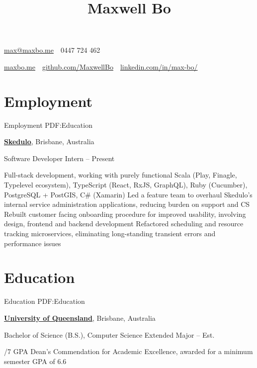 \documentclass[a4paper,10pt,oneside]{article}
\begin{document}

\title{Maxwell Bo}

\begin{subtitle}
\par \href{mailto:max@maxbo.me}{max@maxbo.me} \,\BulletSymbol\, 0447 724 462

\par \href{http://maxbo.me/}{maxbo.me} 
\,\BulletSymbol\, 
\href{https://github.com/MaxwellBo}{github.com/MaxwellBo}
\,\BulletSymbol\, 
\href{https://www.linkedin.com/in/max-bo/}{linkedin.com/in/max-bo/}

\end{subtitle}

\begin{body}


\section
{Employment}
{Employment}
{PDF:Education}

\href{https://skedulo.com/}{\textbf{Skedulo}}, Brisbane, Australia
\par Software Developer Intern\hfill {} -- Present 
\begin{detail}
	\BulletItem Full-stack development, working with purely functional Scala (Play, Finagle, Typelevel ecosystem),\newline
	TypeScript (React, RxJS, GraphQL), Ruby (Cucumber), PostgreSQL + PostGIS, C\# (Xamarin)
	\BulletItem Led a feature team to overhaul Skedulo's internal service administration applications, reducing burden on support and CS
	\BulletItem Rebuilt customer facing onboarding procedure for improved usability, involving design, frontend and backend development
	\BulletItem Refactored scheduling and resource tracking microservices, eliminating long-standing transient errors and performance issues
\end{detail}


\section
{Education}
{Education}
{PDF:Education}

\href{https://www.uq.edu.au/}{\textbf{University of Queensland}}, Brisbane, Australia
\par Bachelor of Science (B.S.), Computer Science Extended Major\hfill {} -- Est. 
\begin{detail}
/7 GPA
\BulletItem Dean's Commendation for Academic Excellence, awarded for a minimum semester GPA of 6.6 \hfill {}
\end{detail}


\end{body}
\end{document}
